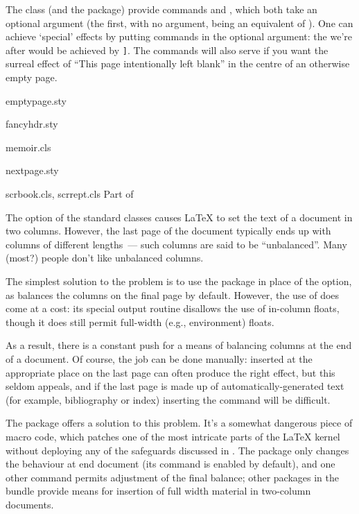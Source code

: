 The  class (and the  package)
provide commands  and ,
which both take an optional argument (the first, with no argument,
being an equivalent of ).  One can achieve
`special' effects by putting commands in the optional argument: the
 we're after would be achieved by
\csx{cleartooddpage[}\texttt{]}.  The
commands will also serve if you want the surreal effect of ``This page
intentionally left blank'' in the centre of an otherwise empty page.
\begin{ctanrefs}
\item[emptypage.sty]
\item[fancyhdr.sty]
\item[memoir.cls]
\item[nextpage.sty]
\item[scrbook.cls, scrrept.cls]Part of 
\end{ctanrefs}


The  option of the standard classes causes
\LaTeX{} to set the text of a document in two columns.  However, the last
page of the document typically ends up with columns of different
lengths~--- such columns are said to be ``unbalanced''.  Many (most?)
people don't like unbalanced columns.

The simplest solution to the problem is to use the 
package in place of the  option, as
 balances the columns on the final page by default.
However, the use of  does come at a cost: its
special output routine disallows the use of in-column floats, though
it does still permit full-width (e.g., 
environment) floats. 

As a result, there is a constant push for a means of balancing columns
at the end of a  document.  Of course, the job can
be done manually:  inserted at the appropriate place on
the last page can often produce the right effect, but this seldom
appeals, and if the last page is made up of automatically-generated
text (for example, bibliography or index) inserting the command will
be difficult.

The  package offers a solution to this problem.  It's a
somewhat dangerous piece of macro code, which patches one of the most
intricate parts of the \LaTeX{} kernel without deploying any of the
safeguards discussed in .
The package only changes the behaviour at end document (its
 command is enabled by default), and one other command
permits adjustment of the final balance; other packages in the bundle
provide means for insertion of full width material in two-column
documents.

